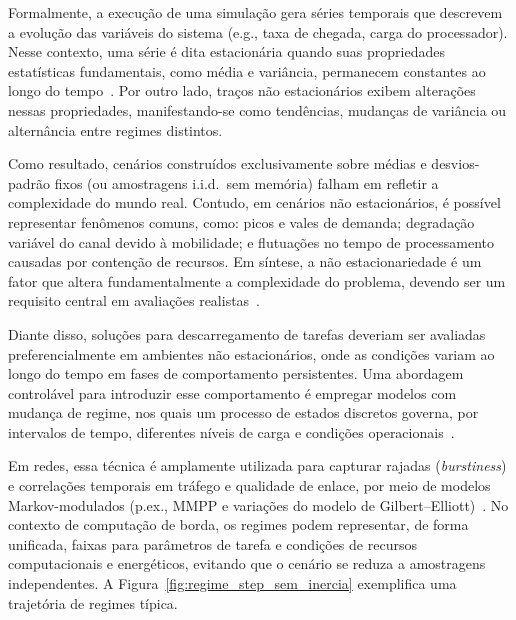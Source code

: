 
Formalmente, a execução de uma simulação gera séries temporais que descrevem a evolução das variáveis do sistema (e.g., taxa de chegada, carga do processador). Nesse contexto, uma série é dita estacionária quando suas propriedades estatísticas fundamentais, como média e variância, permanecem constantes ao longo do tempo~\cite{hyndman2021fpp3}. Por outro lado, traços não estacionários exibem alterações nessas propriedades, manifestando-se como tendências, mudanças de variância ou alternância entre regimes distintos.

Como resultado, cenários construídos exclusivamente sobre médias e desvios-padrão fixos (ou amostragens i.i.d.\ sem memória) falham em refletir a complexidade do mundo real. Contudo, em cenários não estacionários, é possível representar fenômenos comuns, como: picos e vales de demanda; degradação variável do canal devido à mobilidade; e flutuações no tempo de processamento causadas por contenção de recursos. Em síntese, a não estacionariedade é um fator que altera fundamentalmente a complexidade do problema, devendo ser um requisito central em avaliações realistas~\cite{ahmed2022survey,3gpp38901}.

Diante disso, soluções para descarregamento de tarefas deveriam ser avaliadas preferencialmente em ambientes não estacionários, onde as condições variam ao longo do tempo em fases de comportamento persistentes. Uma abordagem controlável para introduzir esse comportamento é empregar modelos com mudança de regime, nos quais um processo de estados discretos governa, por intervalos de tempo, diferentes níveis de carga e condições operacionais~\cite{hamilton1989,fischer1993mmpp,heffes1986mmpp}. 

Em redes, essa técnica é amplamente utilizada para capturar rajadas (\textit{burstiness}) e correlações temporais em tráfego e qualidade de enlace, por meio de modelos Markov-modulados (p.ex., MMPP e variações do modelo de Gilbert--Elliott)~\cite{heffes1986mmpp,fischer1993mmpp,elliott1963}. No contexto de computação de borda, os regimes podem representar, de forma unificada, faixas para parâmetros de tarefa e condições de recursos computacionais e energéticos, evitando que o cenário se reduza a amostragens independentes. A Figura~\ref{fig:regime_step_sem_inercia} exemplifica uma trajetória de regimes típica.

